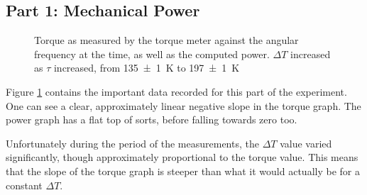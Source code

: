 \documentclass[a4paper]{scrartcl}
\begin{document}
\subsection{Part 1: Mechanical Power}
\begin{figure}
    \centering
    \caption{Torque as measured by the torque meter against the angular frequency at the time, as well as the computed power. \(\Delta T\) increased as \(\tau\) increased, from \SI{135 \pm 1}{\kelvin} to \SI{197 \pm 1}{\kelvin}}
    \label{fig:part1}
\end{figure}

Figure \ref{fig:part1} contains the important data recorded for this part of the experiment. One can see a clear, approximately linear negative slope in the torque graph. The power graph has a flat top of sorts, before falling towards zero too.

Unfortunately during the period of the measurements, the \(\Delta T\) value varied significantly, though approximately proportional to the torque value. This means that the slope of the torque graph is steeper than what it would actually be for a constant \(\Delta T\).
\end{document}
